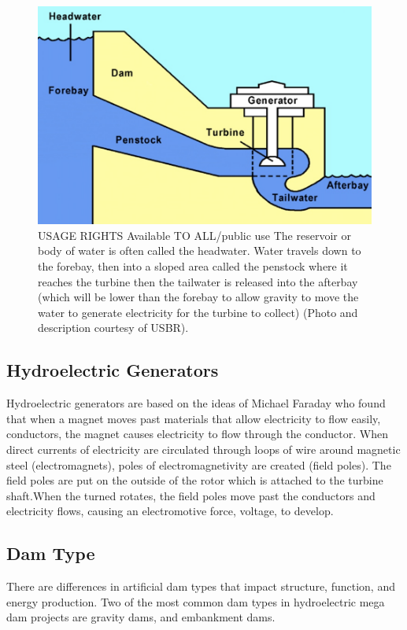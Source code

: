 \documentclass{book}\usepackage{knitr}
\begin{document}
\begin{figure}
\includegraphics[width=\textwidth]{images/diagram.png}
\caption{USAGE RIGHTS Available TO ALL/public use The reservoir or body of water is often called the headwater. Water travels down to the forebay, then into a sloped area called the penstock where it reaches the turbine then the tailwater is released into the afterbay (which will be lower than the forebay to allow gravity to move the water to generate electricity for the turbine to collect) (Photo and description courtesy of USBR).}
\label{fig:helps}
\end{figure}


\subsection{Hydroelectric Generators}
  Hydroelectric generators are based on the ideas of Michael Faraday who found that when a magnet moves past materials that allow electricity to flow easily, conductors, the magnet causes electricity to flow through the conductor. When direct currents of electricity are circulated through loops of wire around magnetic steel (electromagnets), poles of electromagnetivity are created (field poles). The field poles are put on the outside of the rotor which is attached to the turbine shaft.When the turned rotates, the field poles move past the conductors and electricity flows, causing an electromotive force, voltage, to develop. 
\subsection{Dam Type}
There are differences in artificial dam types that impact structure, function, and energy production. Two of the most common dam types in hydroelectric mega dam projects are gravity dams, and embankment dams. 
\end{document}
